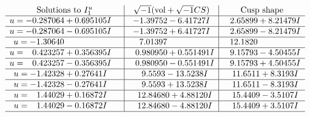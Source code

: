 \documentclass[1p]{elsarticle_modified}
\theoremstyle{definition}
\newcommand{\I}{\sqrt{-1}}
\begin{document}
$$\begin{array}{c|c|c}  
\text{Solutions to }I^u_{1}& \I (\text{vol} + \sqrt{-1}CS) & \text{Cusp shape}\\
 \hline 
\begin{aligned}
u &= -0.287064 + 0.695105 I\end{aligned}
 & -1.39752 - 6.41727 I & \phantom{-}2.65899 + 8.21479 I \\ \hline\begin{aligned}
u &= -0.287064 - 0.695105 I\end{aligned}
 & -1.39752 + 6.41727 I & \phantom{-}2.65899 - 8.21479 I \\ \hline\begin{aligned}
u &= -1.30640\phantom{ +0.000000I}\end{aligned}
 & \phantom{-}7.01397\phantom{ +0.000000I} & \phantom{-}12.1820\phantom{ +0.000000I} \\ \hline\begin{aligned}
u &= \phantom{-}0.423257 + 0.356395 I\end{aligned}
 & \phantom{-}0.980950 + 0.551491 I & \phantom{-}9.15793 - 4.50455 I \\ \hline\begin{aligned}
u &= \phantom{-}0.423257 - 0.356395 I\end{aligned}
 & \phantom{-}0.980950 - 0.551491 I & \phantom{-}9.15793 + 4.50455 I \\ \hline\begin{aligned}
u &= -1.42328 + 0.27641 I\end{aligned}
 & \phantom{-}9.5593 - 13.5238 I & \phantom{-}11.6511 + 8.3193 I \\ \hline\begin{aligned}
u &= -1.42328 - 0.27641 I\end{aligned}
 & \phantom{-}9.5593 + 13.5238 I & \phantom{-}11.6511 - 8.3193 I \\ \hline\begin{aligned}
u &= \phantom{-}1.44029 + 0.16872 I\end{aligned}
 & \phantom{-}12.84680 + 4.88120 I & \phantom{-}15.4409 - 3.5107 I \\ \hline\begin{aligned}
u &= \phantom{-}1.44029 - 0.16872 I\end{aligned}
 & \phantom{-}12.84680 - 4.88120 I & \phantom{-}15.4409 + 3.5107 I\\
 \hline 
 \end{array}$$\newpage\newpage\renewcommand{\arraystretch}{1}
\end{document}

